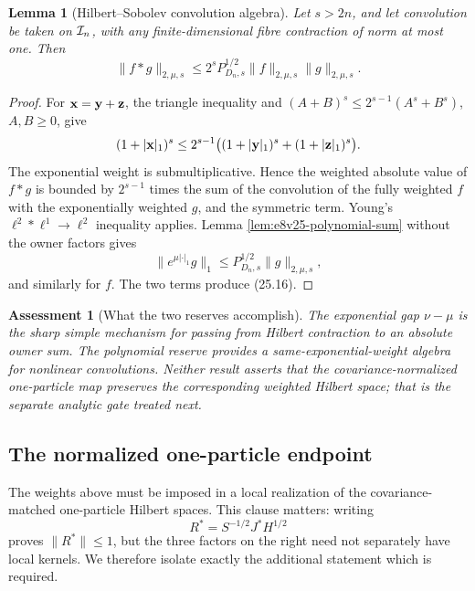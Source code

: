 \documentclass[11pt,oneside]{book}
\newtheorem{lemma}[theorem]{Lemma}
\newtheorem{assessment}[theorem]{Assessment}
\theoremstyle{definition}
\theoremstyle{remark}
\begin{document}
\begin{lemma}[Hilbert--Sobolev convolution algebra]
\label{lem:e8v25-convolution}
Let \(s>2n\), and let convolution be taken on
\({\cal I}_n\), with any finite-dimensional fibre contraction of norm
at most one.  Then
\[
 \|f*g\|_{2,\mu,s}
 \leq 2^sP_{D_n,s}^{1/2}
       \|f\|_{2,\mu,s}\|g\|_{2,\mu,s}.                            \tag{25.16}
\]
\end{lemma}

\begin{proof}
For \({\bf x}={\bf y}+{\bf z}\), the triangle inequality and
\((A+B)^s\leq2^{s-1}(A^s+B^s)\), \(A,B\geq0\), give
\[
 (1+|{\bf x}|_1)^s
 \leq2^{s-1}\bigl((1+|{\bf y}|_1)^s+
                  (1+|{\bf z}|_1)^s\bigr).
\]
The exponential weight is submultiplicative.  Hence the weighted
absolute value of \(f*g\) is bounded by \(2^{s-1}\) times the sum of
the convolution of the fully weighted \(f\) with the exponentially
weighted \(g\), and the symmetric term.  Young's
\(\ell^2*\ell^1\to\ell^2\) inequality applies.  Lemma
\ref{lem:e8v25-polynomial-sum} without the owner factors gives
\[
 \|e^{\mu|\cdot|_1}g\|_1
 \leq P_{D_n,s}^{1/2}\|g\|_{2,\mu,s},
\]
and similarly for \(f\).  The two terms produce (25.16).
\end{proof}

\begin{assessment}[What the two reserves accomplish]
\label{ass:e8v25-reserves}
The exponential gap \(\nu-\mu\) is the sharp simple mechanism for
passing from Hilbert contraction to an absolute owner sum.  The
polynomial reserve provides a same-exponential-weight algebra for
nonlinear convolutions.  Neither result asserts that the
covariance-normalized one-particle map preserves the corresponding
weighted Hilbert space; that is the separate analytic gate treated
next.
\end{assessment}

\subsection{The normalized one-particle endpoint}

The weights above must be imposed in a local realization of the
covariance-matched one-particle Hilbert spaces.  This clause matters:
writing
\[
                     R^*=S^{-1/2}J^*H^{1/2}                      \tag{25.17}
\]
proves \(\|R^*\|\leq1\), but the three factors on the right need not
separately have local kernels.  We therefore isolate exactly the
additional statement which is required.
\end{document}
